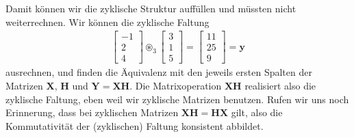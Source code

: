 Damit können wir die zyklische Struktur auffüllen und müssten nicht
weiterrechnen.
%
Wir können die zyklische Faltung
\begin{align}
\begin{bmatrix}
-1\\2\\4
\end{bmatrix}
\circledast_3
\begin{bmatrix}
3\\1\\5
\end{bmatrix}
=
\begin{bmatrix}
11\\25\\9
\end{bmatrix}
= \bm{y}
\end{align}
ausrechnen, und finden die Äquivalenz mit den jeweils ersten Spalten der Matrizen
$\bm{X}$, $\bm{H}$ und $\bm{Y} = \bm{X} \bm{H}$.
Die Matrixoperation $\bm{X} \bm{H}$
realisiert also die zyklische Faltung,
eben weil wir zyklische Matrizen benutzen. Rufen wir uns noch Erinnerung,
dass bei zyklischen Matrizen $\bm{X} \bm{H} = \bm{H} \bm{X}$ gilt, also
die Kommutativität der (zyklischen) Faltung konsistent abbildet.

